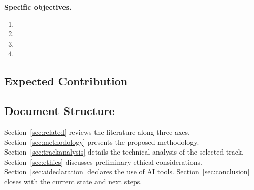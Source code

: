 \noindent\textbf{Specific objectives.}
\begin{enumerate}
  \item {}
  \item {}
  \item {}
  \item {}
\end{enumerate}

\subsection{Expected Contribution}
\label{subsec:contribution}

\subsection{Document Structure}
\label{subsec:structure}
Section~\ref{sec:related} reviews the literature along three axes.
Section~\ref{sec:methodology} presents the proposed methodology.
Section~\ref{sec:trackanalysis} details the technical analysis of the
selected track. Section~\ref{sec:ethics} discusses preliminary ethical
considerations. Section~\ref{sec:aideclaration} declares the use of AI
tools. Section~\ref{sec:conclusion} closes with the current state and
next steps.